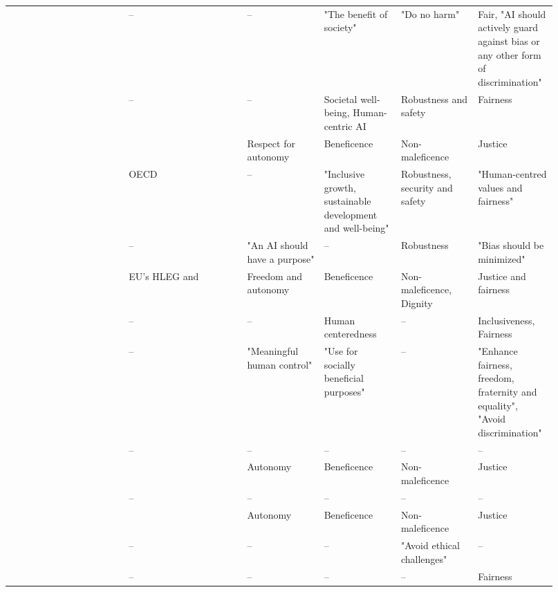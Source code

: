 \begin{landscape}
\begin{ThreePartTable}
\begin{longtable}{P{0.2\linewidth}P{0.2\linewidth}P{0.13\linewidth}P{0.13\linewidth}P{0.13\linewidth}P{0.13\linewidth}}
        \textcite{Nauck_2019} & -- & -- & "The benefit of society" & "Do no harm" & Fair, "AI should \mbox{actively} guard against bias or any other form of discrimination" \\ 
        \textcite{Papagiannidis_2022} & -- & -- & Societal well-being, Human-centric AI & Robustness and safety & Fairness \\ 
        \textcite{Peters_2020} & \textcite{Floridi_2018} & Respect for autonomy & Beneficence & Non-maleficence & Justice \\ 
        \textcite{Rizinski_2022} & OECD & -- & "Inclusive growth, sustainable development and well-being" & Robustness, security and safety & "Human-centred values and fairness" \\ 
        \textcite{Rothenberger_2019} & -- & "An AI should have a purpose" & -- & Robustness & "Bias should be \mbox{minimized}" \\ 
        \textcite{Ryan_2021} & EU's HLEG and \textcite{Jobin_2019} & Freedom and autonomy & Beneficence & Non-maleficence, \mbox{Dignity} & Justice and fairness \\ 
        \textcite{Siala_2022} & -- & -- & Human centeredness & -- & Inclusiveness, Fairness \\ 
        \textcite{Thelisson_2018} & -- & "Meaningful human control" & "Use for socially \mbox{beneficial} purposes" & -- & "Enhance fairness, freedom, fraternity and equality", "Avoid discrimination" \\ 
        \textcite{Vakkuri_2022} & -- & -- & -- & -- & -- \\ 
        \textcite{vanBruxvoort_2021} & \textcite{Floridi_2018} & Autonomy & Beneficence & Non-maleficence & Justice \\ 
        \textcite{Vetro_2019} & -- & -- & -- & -- & -- \\ 
        \textcite{WangW_2021} & \textcite{Floridi_2018} & Autonomy & Beneficence & Non-maleficence & Justice \\ 
        \textcite{WangY_2020} & -- & -- & -- & "Avoid ethical \mbox{challenges}" & -- \\ 
        \textcite{Werder_2022} & -- & -- & -- & -- & Fairness \\ 


\end{longtable}
\end{ThreePartTable}
\end{landscape}
